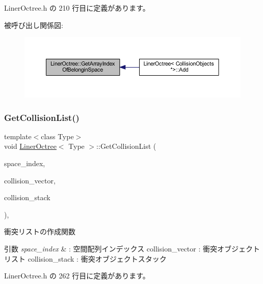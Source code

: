  Liner\+Octree.\+h の 210 行目に定義があります。

被呼び出し関係図\+:\nopagebreak
\begin{figure}[H]
\begin{center}
\leavevmode
\includegraphics[width=350pt]{class_liner_octree_a4d7c6e47990d16ed28e3ab89443c1af4_icgraph}
\end{center}
\end{figure}
\mbox{\label{class_liner_octree_ac74ebba8b5f12fa94745a899b222e2b6}} 
\subsubsection{\texorpdfstring{Get\+Collision\+List()}{GetCollisionList()}}
{\footnotesize\ttfamily template$<$class Type$>$ \\
void \mbox{\hyperlink{class_liner_octree}{Liner\+Octree}}$<$ Type $>$\+::Get\+Collision\+List (\begin{DoxyParamCaption}\item[{D\+W\+O\+RD}]{space\+\_\+index,  }\item[{std\+::vector$<$ Type $>$ $\ast$}]{collision\+\_\+vector,  }\item[{std\+::list$<$ Type $>$ $\ast$}]{collision\+\_\+stack }\end{DoxyParamCaption})\hspace{0.3cm}{\ttfamily [inline]}, {\ttfamily [private]}}



衝突リストの作成関数 


\begin{DoxyParams}{引数}
{\em space\+\_\+index} & \+: 空間配列インデックス collision\+\_\+vector \+: 衝突オブジェクトリスト collision\+\_\+stack \+: 衝突オブジェクトスタック \\
\hline
\end{DoxyParams}


 Liner\+Octree.\+h の 262 行目に定義があります。

